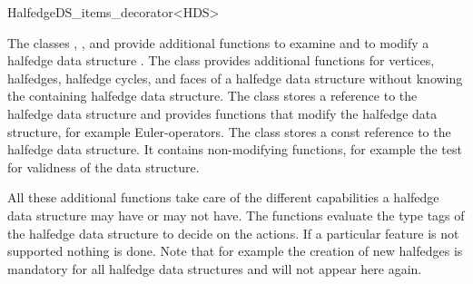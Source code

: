 
\ccRefPageBegin



\begin{ccRefClass}{HalfedgeDS_items_decorator<HDS>}

\ccDefinition

The classes ,
, and
 provide additional functions
to examine and to modify a halfedge data structure . The class
 provides additional functions
for vertices, halfedges, { halfedge cycles}, and faces 
of a halfedge data structure
without knowing the containing halfedge data structure. The class
 stores a reference to the halfedge
data structure and provides functions that modify the halfedge data
structure, for example Euler-operators. The class
 stores a const reference to
the halfedge data structure. It contains non-modifying functions, for
example the test for validness of the data structure.

All these additional functions take care of the different capabilities
a halfedge data structure may have or may not have.  The functions
evaluate the type tags of the halfedge data structure to decide on the
actions. If a particular feature is not supported nothing is done.
Note that for example the creation of new halfedges is mandatory for
all halfedge data structures and will not appear here again.


\ccTypes

\ccThreeToTwo

\ccGlue
{}
\ccGlue
{}
\ccGlue
{}
\ccGlue
{}
\ccGlue
{}


\end{ccRefClass}
